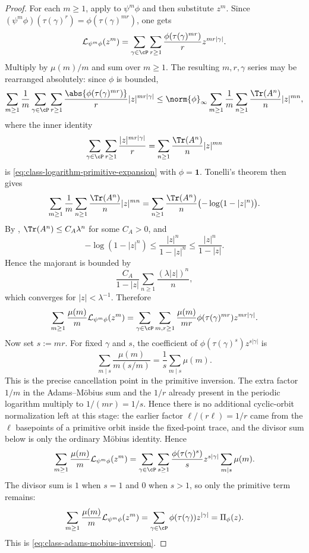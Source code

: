 \begin{proof}
  For each \(m\ge 1\), apply
   to \(\psi^m\phi\) and
  then substitute \(z^m\). Since
  \((\psi^m\phi)(\tau(\gamma)^r)=\phi(\tau(\gamma)^{mr})\), one gets
  \[
    \mathcal L_{\psi^m\phi}(z^m)
    =
    \sum_{\gamma\in\cP}\sum_{r\ge 1}
      \frac{\phi(\tau(\gamma)^{mr})}{r}z^{mr|\gamma|}.
  \]
  Multiply by \(\mu(m)/m\) and sum over \(m\ge 1\). The resulting
  \(m,r,\gamma\) series may be rearranged absolutely: since \(\phi\) is
  bounded,
  \[
    \sum_{m\ge 1}\frac{1}{m}
      \sum_{\gamma\in\cP}\sum_{r\ge 1}
        \frac{\abs{\phi(\tau(\gamma)^{mr})}}{r}|z|^{mr|\gamma|}
    \le
    \norm{\phi}_\infty
    \sum_{m\ge 1}\frac{1}{m}
      \sum_{n\ge 1}\frac{\Tr(A^n)}{n}|z|^{mn},
  \]
  where the inner identity
  \[
    \sum_{\gamma\in\cP}\sum_{r\ge 1}\frac{|z|^{mr|\gamma|}}{r}
    =
    \sum_{n\ge 1}\frac{\Tr(A^n)}{n}|z|^{mn}
  \]
  is \eqref{eq:class-logarithm-primitive-expansion} with
  \(\phi=\mathbf 1\). Tonelli's theorem then gives
  \[
    \sum_{m\ge 1}\frac{1}{m}
      \sum_{n\ge 1}\frac{\Tr(A^n)}{n}|z|^{mn}
    =
    \sum_{n\ge 1}\frac{\Tr(A^n)}{n}
      \bigl(-\log(1-|z|^n)\bigr).
  \]
  By ,
  \(\Tr(A^n)\le C_A\lambda^n\) for some \(C_A>0\), and
  \[
    -\log(1-|z|^n)\le \frac{|z|^n}{1-|z|^n}\le \frac{|z|^n}{1-|z|}.
  \]
  Hence the majorant is bounded by
  \[
    \frac{C_A}{1-|z|}
    \sum_{n\ge 1}\frac{(\lambda|z|)^n}{n},
  \]
  which converges for \(|z|<\lambda^{-1}\). Therefore
  \[
    \sum_{m\ge 1}\frac{\mu(m)}{m}\mathcal L_{\psi^m\phi}(z^m)
    =
    \sum_{\gamma\in\cP}\sum_{m,r\ge 1}
      \frac{\mu(m)}{mr}\phi(\tau(\gamma)^{mr})z^{mr|\gamma|}.
  \]
  Now set \(s:=mr\). For fixed \(\gamma\) and \(s\), the coefficient of
  \(\phi(\tau(\gamma)^s)z^{s|\gamma|}\) is
  \[
    \sum_{m\mid s}\frac{\mu(m)}{m(s/m)}
    =
    \frac{1}{s}\sum_{m\mid s}\mu(m).
  \]
  This is the precise cancellation point in the primitive inversion.  The
  extra factor \(1/m\) in the Adams--M\"obius sum and the \(1/r\) already
  present in the periodic logarithm multiply to \(1/(mr)=1/s\).  Hence there
  is no additional cyclic-orbit normalization left at this stage: the earlier
  factor \(\ell/(r\ell)=1/r\) came from the \( \ell \) basepoints of a
  primitive orbit inside the fixed-point trace, and the divisor sum below is
  only the ordinary M\"obius identity.
  Hence
  \[
    \sum_{m\ge 1}\frac{\mu(m)}{m}\mathcal L_{\psi^m\phi}(z^m)
    =
    \sum_{\gamma\in\cP}\sum_{s\ge 1}
      \frac{\phi(\tau(\gamma)^s)}{s}z^{s|\gamma|}
      \sum_{m\mid s}\mu(m).
  \]
  The divisor sum is \(1\) when \(s=1\) and \(0\) when \(s>1\), so only
  the primitive term remains:
  \[
    \sum_{m\ge 1}\frac{\mu(m)}{m}\mathcal L_{\psi^m\phi}(z^m)
    =
    \sum_{\gamma\in\cP}\phi(\tau(\gamma))z^{|\gamma|}
    =
    \Pi_\phi(z).
  \]
  This is \eqref{eq:class-adams-mobius-inversion}.
\end{proof}

